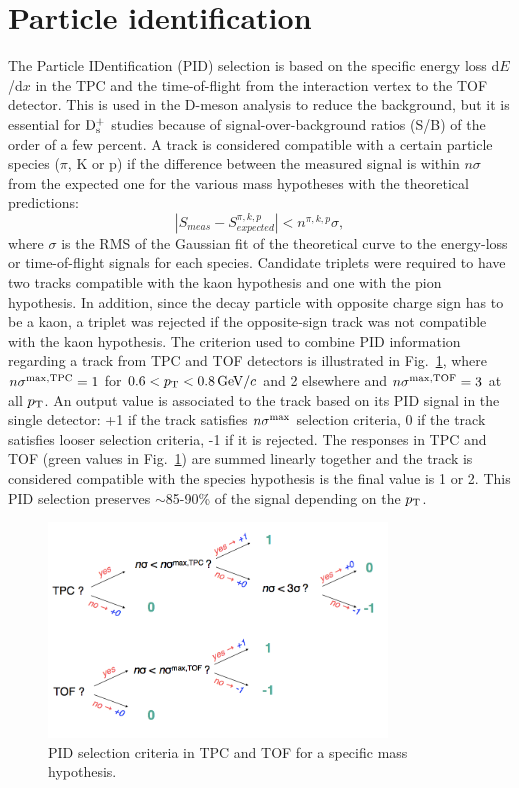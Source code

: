 \section{Particle identification}
\label{Sec:PID}
The Particle IDentification (PID) selection is based on the specific energy loss 
d$E$/d$x$ in the TPC and the time-of-flight from the interaction vertex to the 
TOF detector. This is used in the D-meson analysis to reduce the background, 
but it is essential for ${\rm D_s^+}$ studies because of signal-over-background
 ratios (S/B) of the order of a few percent.
A track is  considered compatible with a certain particle species 
($\pi$, K or p) if the difference between the measured signal is
 within $n\sigma$ from the expected one for the various mass hypotheses
  with the theoretical predictions:
\[
|S_{meas}-S^{\pi,k,p}_{expected}| < n^{\pi,k,p}\sigma ,
\]
where $\sigma$ is the RMS of the Gaussian fit of the theoretical 
curve to the energy-loss or time-of-flight signals for each species.
Candidate triplets were required to have two tracks compatible with 
the kaon hypothesis and one with the pion hypothesis. In addition, 
since the decay particle with opposite charge sign has to be a kaon, 
a triplet was rejected if the opposite-sign track was not compatible 
with the kaon hypothesis. 
The criterion used to combine PID information regarding a track from TPC and TOF
detectors is illustrated in Fig.~\ref{fig:strongPID}, where $n\sigma^{\rm max,TPC} = 1$ for
$0.6 < p_{\rm T} < 0.8 \, \mathrm{GeV}/c$ and 2 elsewhere and $n\sigma^{\rm max,TOF} = 3$ at all $p_{\rm T}$.  
An output value is associated to the track based on its PID signal in the single
detector: +1 if the track
satisfies $n\sigma^{\rm max}$ selection criteria, 0 if the track satisfies looser selection criteria,
-1 if it is rejected. The responses in TPC and TOF (green values in Fig.~\ref{fig:strongPID}) 
are summed linearly together 
and the track is considered
compatible with the species hypothesis is the final value is 1 or 2. This
PID selection preserves $\sim$85-90\% of the signal depending on the $p_{\rm T}$.

 
\begin{figure}[!h]
\centering
\includegraphics[width=9cm]{FigCap4/strongPID.png}
\caption{PID selection criteria in TPC and TOF for a specific mass hypothesis.}
\label{fig:strongPID}
\end{figure}


